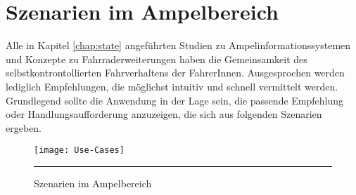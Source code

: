 \chapter{\label{chap:szenarien}Szenarien im Ampelbereich}
Alle in Kapitel \ref{chap:state} angeführten Studien zu Ampelinformationssystemen und Konzepte zu Fahrraderweiterungen haben die Gemeinsamkeit des selbstkontrontollierten Fahrverhaltens der FahrerInnen. Ausgesprochen werden lediglich Empfehlungen, die möglichst intuitiv und schnell vermittelt werden. Grundlegend sollte die Anwendung in der Lage sein, die passende Empfehlung oder Handlungsaufforderung anzuzeigen, die sich aus folgenden Szenarien ergeben.
\begin{figure}[H]  
    \centering  
    \texttt{[image: Use-Cases]} 
    \rule{35em}{0.5pt}
    \caption[Szenarien]{Szenarien im Ampelbereich}
    \label{fig:szenarien}
\end{figure} \vspace{7pt}
